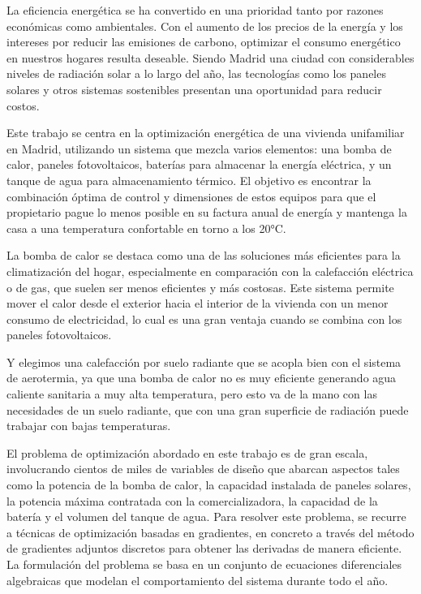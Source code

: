 La eficiencia energética se ha convertido en una prioridad tanto por razones
económicas como ambientales. Con el aumento de los precios de la energía y los
intereses por reducir las emisiones de carbono, optimizar el consumo energético
en nuestros hogares resulta deseable. Siendo Madrid una ciudad con considerables
niveles de radiación solar a lo largo del año, las tecnologías como los paneles
solares y otros sistemas sostenibles presentan una oportunidad para reducir
costos.

Este trabajo se centra en la optimización energética de una vivienda
unifamiliar en Madrid, utilizando un sistema que mezcla varios elementos: una
bomba de calor, paneles fotovoltaicos, baterías para almacenar la energía
eléctrica, y un tanque de agua para almacenamiento térmico. El objetivo es
encontrar la combinación óptima de control y dimensiones de estos equipos para
que el propietario pague lo menos posible en su factura anual de energía y
mantenga la casa a una temperatura confortable en torno a los 20°C.

La bomba de calor se destaca como una de las soluciones más eficientes para la
climatización del hogar, especialmente en comparación con la calefacción
eléctrica o de gas, que suelen ser menos eficientes y más costosas. Este
sistema permite mover el calor desde el exterior hacia el interior de la
vivienda con un menor consumo de electricidad, lo cual es una gran ventaja
cuando se combina con los paneles fotovoltaicos.

Y elegimos una calefacción por suelo radiante que se acopla bien con el sistema
de aerotermia, ya que una bomba de calor no es muy eficiente generando agua
caliente sanitaria a muy alta temperatura, pero esto va de la mano con las
necesidades de un suelo radiante, que con una gran superficie de radiación
puede trabajar con bajas temperaturas.

El problema de optimización abordado en este trabajo es de gran escala,
involucrando cientos de miles de variables de diseño que abarcan aspectos tales
como la potencia de la bomba de calor, la capacidad instalada de paneles
solares, la potencia máxima contratada con la comercializadora, la capacidad de
la batería y el volumen del tanque de agua. Para resolver este problema, se
recurre a técnicas de optimización basadas en gradientes, en concreto a través
del método de gradientes adjuntos discretos para obtener las derivadas de
manera eficiente. La formulación del problema se basa en un conjunto de
ecuaciones diferenciales algebraicas que modelan el comportamiento del sistema
durante todo el año.

